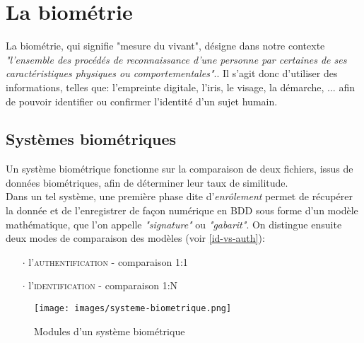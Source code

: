 \section{La biométrie}
La biométrie, qui signifie "mesure du vivant", désigne dans notre contexte \textit{"l'ensemble des procédés de reconnaissance d'une personne par certaines de ses caractéristiques physiques ou comportementales"}.\cite{Xmisc_3}. Il s'agit donc d'utiliser des informations, telles que: l'empreinte digitale, l'iris, le visage, la démarche, ... afin de pouvoir identifier ou confirmer l'identité d'un sujet humain.

\subsection{Systèmes biométriques}
Un système biométrique fonctionne sur la comparaison de deux fichiers, issus de données biométriques, afin de déterminer leur taux de similitude.
\\
Dans un tel système, une première phase dite d'\textit{enrôlement} permet de récupérer la donnée et de l'enregistrer de façon numérique en BDD sous forme d'un modèle mathématique, que l'on appelle \textit{"signature"} ou \textit{"gabarit"}. On distingue ensuite deux modes de comparaison des modèles (voir \ref{id-vs-auth}): 
\begin{itemize}
\item[$\cdot$]l'\textsc{authentification} - comparaison 1:1
\item[$\cdot$]l'\textsc{identification} - comparaison 1:N
\end{itemize}
\begin{figure}[h!]
\texttt{[image: images/systeme-biometrique.png]}
\caption{Modules d'un système biométrique}
\end{figure}

